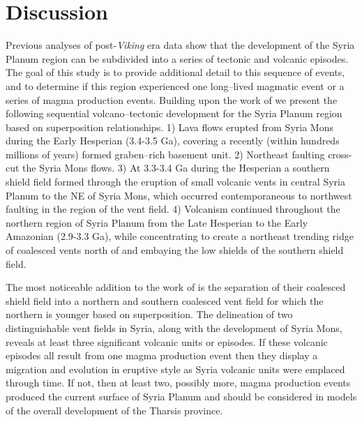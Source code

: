 \documentclass[preprint,review,authoryear,12pt]{elsarticle}
\begin{document}
\section{Discussion}

Previous analyses of post-\textit{Viking} era data show that the development of the Syria Planum region can be subdivided into a series of tectonic and volcanic episodes. The goal of this study is to provide additional detail to this sequence of events, and to determine if this region experienced one long--lived magmatic event or a series of magma production events. Building upon the work of \citet{Baptista2008} we present the following sequential volcano--tectonic development for the Syria Planum region based on superposition relationships. 1) Lava flows erupted from Syria Mons during the Early Hesperian (3.4-3.5 Ga), covering a recently (within hundreds millions of years) formed graben--rich basement unit. 2) Northeast faulting cross-cut the Syria Mons flows. 3) At 3.3-3.4 Ga during the Hesperian a southern shield field formed through the eruption of small volcanic vents in central Syria Planum to the NE of Syria Mons, which occurred contemporaneous to northwest faulting in the region of the vent field. 4) Volcanism continued throughout the northern region of Syria Planum from the Late Hesperian to the Early Amazonian (2.9-3.3 Ga), while concentrating to create a northeast trending ridge of coalesced vents north of and embaying the low shields of the southern shield field.

The most noticeable addition to the work of \citet{Baptista2008} is the separation of their coalesced shield field into a northern and southern coalesced vent field for which the northern is younger based on superposition. The delineation of two distinguishable vent fields in Syria, along with the development of Syria Mons, reveals at least three significant volcanic units or episodes. If these volcanic episodes all result from one magma production event then they display a migration and evolution in eruptive style as Syria volcanic units were emplaced through time. If not, then at least two, possibly more, magma production events produced the current surface of Syria Planum and should be considered in models of the overall development of the Tharsis province.
\end{document}
